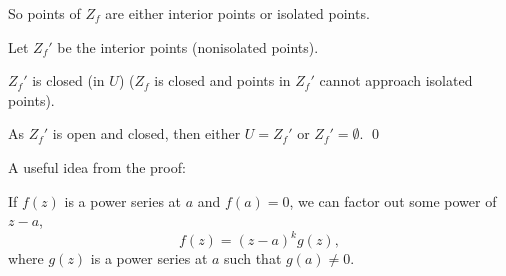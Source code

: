 \documentclass[10pt,aspectratio=169]{beamer}
\begin{document}
\begin{frame}

So points of $Z_f$ are either interior points or isolated points.

\medskip
\pause

Let $Z_f'$ be the interior points (nonisolated points).

\medskip
\pause

$Z_f'$ is closed (in $U$) ($Z_f$ is closed
and points in $Z_f'$ cannot approach isolated points).

\medskip
\pause

As $Z_f'$ is open and closed, then either $U=Z_f'$ or $Z_f' = \emptyset$.
\qed

\end{frame}

\begin{frame}
A useful idea from the proof:

\medskip
\pause

If $f(z)$ is a power series at $a$ and $f(a)=0$,
we can factor out some power of $z-a$,
\pause
\begin{equation*}
f(z) = {(z-a)}^k g(z) ,
\end{equation*}
where $g(z)$ is a power series at $a$ such that $g(a) \not= 0$.
\end{frame}
\end{document}
